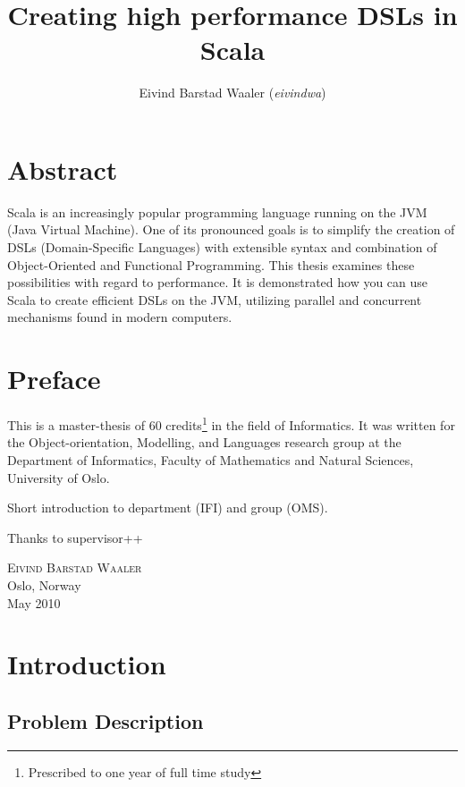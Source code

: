 \documentclass[a4paper,english]{report}
\title{Creating high performance DSLs in Scala}
\author{Eivind Barstad Waaler (\emph{eivindwa})}
\begin{document}
\uiosloforside[kind={Master thesis},boxcolor=matnat,textcolor=white]

\chapter*{Abstract}

Scala is an increasingly popular programming language running on the
JVM (Java Virtual Machine). One of its pronounced goals is to simplify
the creation of DSLs (Domain-Specific Languages) with extensible
syntax and combination of Object-Oriented and Functional
Programming. This thesis examines these possibilities with regard to
performance. It is demonstrated how you can use Scala to create
efficient DSLs on the JVM, utilizing parallel and concurrent
mechanisms found in modern computers.

\tableofcontents

\listoftables

\listoffigures

\chapter*{Preface}

This is a master-thesis of 60 credits\footnote{Prescribed to one year
  of full time study} in the field of Informatics. It was written for
the Object-orientation, Modelling, and Languages research
group\cite{oms} at the Department of Informatics, Faculty of
Mathematics and Natural Sciences, University of Oslo.

Short introduction to department (IFI) and group (OMS).

Thanks to supervisor++

\begin{flushright}
\textsc{Eivind Barstad Waaler}\\
Oslo, Norway\\
May 2010
\end{flushright}

\chapter{Introduction}

\section{Problem Description}
\end{document}
